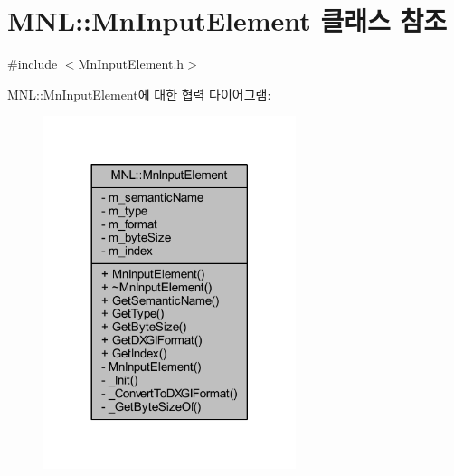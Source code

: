 \hypertarget{class_m_n_l_1_1_mn_input_element}{}\section{M\+NL\+:\+:Mn\+Input\+Element 클래스 참조}
\label{class_m_n_l_1_1_mn_input_element}


{\ttfamily \#include $<$Mn\+Input\+Element.\+h$>$}



M\+NL\+:\+:Mn\+Input\+Element에 대한 협력 다이어그램\+:\nopagebreak
\begin{figure}[H]
\begin{center}
\leavevmode
\includegraphics[width=209pt]{class_m_n_l_1_1_mn_input_element__coll__graph}
\end{center}
\end{figure}
